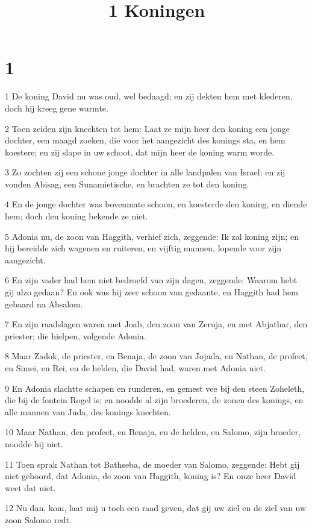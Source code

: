 

\title{1 Koningen}



\chapter{1}

\par 1 De koning David nu was oud, wel bedaagd; en zij dekten hem met klederen, doch hij kreeg gene warmte.
\par 2 Toen zeiden zijn knechten tot hem: Laat ze mijn heer den koning een jonge dochter, een maagd zoeken, die voor het aangezicht des konings sta, en hem koestere; en zij slape in uw schoot, dat mijn heer de koning warm worde.
\par 3 Zo zochten zij een schone jonge dochter in alle landpalen van Israel; en zij vonden Abisag, een Sunamietische, en brachten ze tot den koning.
\par 4 En de jonge dochter was bovenmate schoon, en koesterde den koning, en diende hem; doch den koning bekende ze niet.
\par 5 Adonia nu, de zoon van Haggith, verhief zich, zeggende: Ik zal koning zijn; en hij bereidde zich wagenen en ruiteren, en vijftig mannen, lopende voor zijn aangezicht.
\par 6 En zijn vader had hem niet bedroefd van zijn dagen, zeggende: Waarom hebt gij alzo gedaan? En ook was hij zeer schoon van gedaante, en Haggith had hem gebaard na Absalom.
\par 7 En zijn raadslagen waren met Joab, den zoon van Zeruja, en met Abjathar, den priester; die hielpen, volgende Adonia.
\par 8 Maar Zadok, de priester, en Benaja, de zoon van Jojada, en Nathan, de profeet, en Simei, en Rei, en de helden, die David had, waren met Adonia niet.
\par 9 En Adonia slachtte schapen en runderen, en gemest vee bij den steen Zoheleth, die bij de fontein Rogel is; en noodde al zijn broederen, de zonen des konings, en alle mannen van Juda, des konings knechten.
\par 10 Maar Nathan, den profeet, en Benaja, en de helden, en Salomo, zijn broeder, noodde hij niet.
\par 11 Toen sprak Nathan tot Bathseba, de moeder van Salomo, zeggende: Hebt gij niet gehoord, dat Adonia, de zoon van Haggith, koning is? En onze heer David weet dat niet.
\par 12 Nu dan, kom, laat mij u toch een raad geven, dat gij uw ziel en de ziel van uw zoon Salomo redt.
